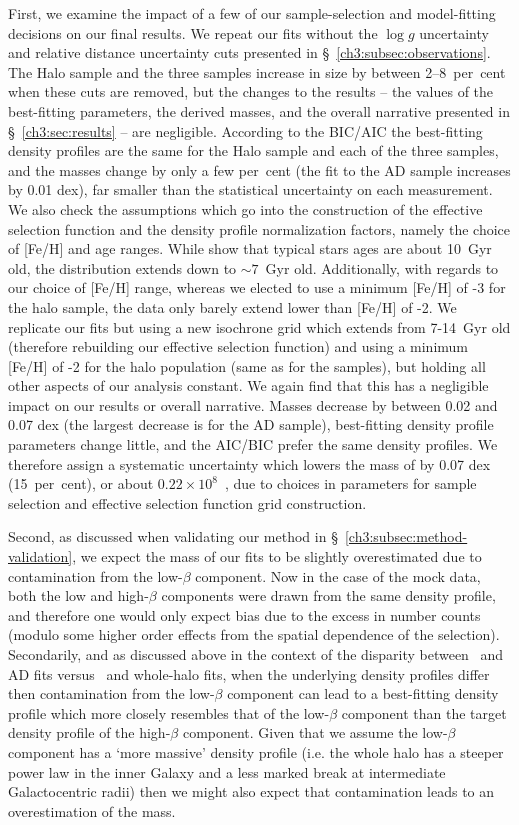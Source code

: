 First, we examine the impact of a few of our sample-selection and model-fitting decisions on our final results. We repeat our fits without the $\log g$ uncertainty and relative distance uncertainty cuts presented in \S~\ref{ch3:subsec:observations}. The Halo sample and the three \gse samples increase in size by between 2--8~per~cent when these cuts are removed, but the changes to the results -- the values of the best-fitting parameters, the derived masses, and the overall narrative presented in \S~\ref{ch3:sec:results} -- are negligible. According to the BIC/AIC the best-fitting density profiles are the same for the Halo sample and each of the three \gse samples, and the masses change by only a few per~cent (the fit to the AD sample increases by 0.01 dex), far smaller than the statistical uncertainty on each measurement. We also check the assumptions which go into the construction of the effective selection function and the density profile normalization factors, namely the choice of [Fe/H] and age ranges. While \textcite{montalban21} show that typical \gse stars ages are about 10~Gyr old, the distribution extends down to $\sim 7$~Gyr old. Additionally, with regards to our choice of [Fe/H] range, whereas we elected to use a minimum [Fe/H] of -3 for the halo sample, the data only barely extend lower than [Fe/H] of -2. We replicate our fits but using a new isochrone grid which extends from 7-14~Gyr old (therefore rebuilding our effective selection function) and using a minimum [Fe/H] of -2 for the halo population (same as for the \gse samples), but holding all other aspects of our analysis constant. We again find that this has a negligible impact on our results or overall narrative. Masses decrease by between 0.02 and 0.07 dex (the largest decrease is for the AD \gse sample), best-fitting density profile parameters change little, and the AIC/BIC prefer the same density profiles. We therefore assign a systematic uncertainty which lowers the mass of \gse by 0.07 dex (15~per~cent), or about $0.22\times10^{8}$~\Msun, due to choices in parameters for sample selection and effective selection function grid construction.

Second, as discussed when validating our method in \S~\ref{ch3:subsec:method-validation}, we expect the mass of our fits to be slightly overestimated due to contamination from the low-$\beta$ component. Now in the case of the mock data, both the low and high-$\beta$ components were drawn from the same density profile, and therefore one would only expect bias due to the excess in number counts (modulo some higher order effects from the spatial dependence of the selection). Secondarily, and as discussed above in the context of the disparity between \eLz\ and AD fits versus \JRLz\ and whole-halo fits, when the underlying density profiles differ then contamination from the low-$\beta$ component can lead to a best-fitting density profile which more closely resembles that of the low-$\beta$ component than the target density profile of the high-$\beta$ component. Given that we assume the low-$\beta$ component has a `more massive' density profile (i.e. the whole halo has a steeper power law in the inner Galaxy and a less marked break at intermediate Galactocentric radii) then we might also expect that contamination leads to an overestimation of the mass.

